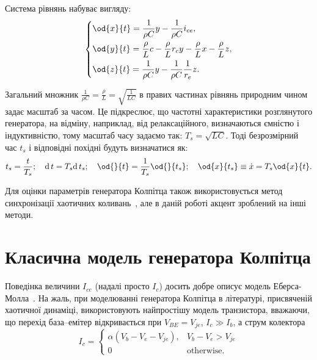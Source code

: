 Система рівнянь набуває вигляду:
%
\begin{equation}
\label{atu:eq:colp_phys2}
\begin{dcases}
  \od{x}{t}  = \dfrac{1}{\rho C}  y - \dfrac{1}{\rho C} i_{ce} , \\
  \od{y}{t}  = \dfrac{\rho}{L} c    - \dfrac{\rho}{L} r_c y - \dfrac{\rho}{L} x- \dfrac{\rho}{L} z, \\
  \od{z}{t}  = \dfrac{1}{\rho C}  y - \dfrac{1}{\rho C} \dfrac{1}{r_e} z.
\end{dcases}
\end{equation}

Загальний множник
$ \frac{1}{\rho C} = \frac{\rho}{L} = \sqrt{\frac{1}{LC}} $ в правих частинах рівнянь
природним чином задає масштаб за часом. Це підкреслює,
що частотні характеристики розглянутого генератора, на
відміну, наприклад, від релаксаційного, визначаються ємністю і
індуктивністю, тому масштаб часу задаємо так:
$ T_s = \sqrt{L C} $. Тоді безрозмірний час
$ t_s $ і відповідні похідні будуть визначатися як:
%
\[
  t_s = \frac{t}{T_s}; \quad
  \mathrm{d}\, t = T_s \mathrm{d}\, t_s; \quad
  \od{}{t}  = \frac{1}{T_s} \od{}{t_s}; \quad
  \od{x}{t_s} \equiv \dot{x} = T_s \od{x}{t} .
\]

Для оцінки параметрів генератора Колпітца також
використовується метод синхронізації хаотичних
коливань~\cite{PhysRevE.80.016201,picovskii_syncro,bonetti_super_persistent_colpitts}, але в даній
роботі акцент зроблений на інші методи.


\section{Класична модель генератора Колпітца}  %

Поведінка величини
$ I_{ce} $ (надалі просто
$ I_c $) досить добре описує модель Еберса-Молла~\cite{horowitz}. На жаль,
при моделюванні генератора Колпітца в літературі, присвяченій
хаотичної динаміці, використовують найпростішу модель
транзистора, вважаючи, що перехід база--емітер відкривається при
$ V_{BE} = V_{je} $,
$ I_c \gg I_b $, а струм колектора
%
\begin{equation}
I_c =
  \begin{cases}
    \alpha ( V_b - V_e - V_{je} ), & V_b - V_e > V_{je} \\
    0                              & \text{otherwise}.
  \end{cases}
  \label{atu:eq:bjt_libear_model}
\end{equation}


